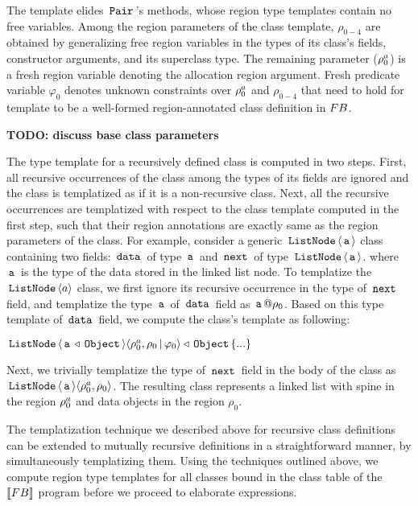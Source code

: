 The template elides $\,{\tt Pair}\,$'s methods, whose region type templates
contain no free variables. Among the region parameters of the class
template, $\rho_{0-4}$ are obtained by generalizing free region
variables in the types of its class's fields, constructor arguments,
and its superclass type.  The remaining parameter ($\rho^a_0$) is a
fresh region variable denoting the allocation region argument. Fresh
predicate variable $\varphi_0$ denotes unknown constraints over
$\rho^a_0$ and $\rho_{0-4}$ that need to hold for template to be a
well-formed region-annotated class definition in ${\sc FB}$. 

\textbf{TODO: discuss base class parameters}

The type template for a recursively defined class is computed in two
steps. First, all recursive occurrences of the class among the types of
its fields are ignored and the class is templatized as if it is a
non-recursive class. Next, all the recursive occurrences are
templatized with respect to the class template computed in the first
step, such that their region annotations are exactly same as the
region parameters of the class. For example, consider a generic
$\,{\tt ListNode}\,\langle \,{\tt a}\, \rangle$ class containing two fields: $\,{\tt data}\,$ of
type $\,{\tt a}\,$ and $\,{\tt next}\,$ of type $\,{\tt ListNode}\,\langle \,{\tt a}\, \rangle$.
where $\,{\tt a}\,$ is the type of the data stored in the linked list node.
To templatize the $\,{\tt ListNode}\,\langle a \rangle$ class, we first ignore its
recursive occurrence in the type of $\,{\tt next}\,$ field, and templatize
the type $\,{\tt a}\,$ of $\,{\tt data}\,$ field as $\,{\tt a}\,@\rho_0$. Based on this
type template of $\,{\tt data}\,$ field, we compute the class's template as
following:
\begin{center}
$\,{\tt ListNode}\,\langle \,{\tt a}\,\triangleleft\,{\tt Object}\, \rangle
\langle \rho^a_0,\rho_0\,|\,\varphi_0 \rangle \triangleleft \,{\tt Object}\, \{...\}$
\end{center}
Next, we trivially templatize the type of $\,{\tt next}\,$ field in the body
of the class as $\,{\tt ListNode}\,\langle \,{\tt a}\, \rangle\langle \rho^a_0,\rho_0 \rangle$.
The resulting class represents a linked list with spine in the region
$\rho^a_0$ and data objects in the region $\rho_0$.

The templatization technique we described above for recursive class
definitions can be extended to mutually recursive definitions in a
straightforward manner, by simultaneously templatizing them. Using the
techniques outlined above, we compute region type templates for all
classes bound in the class table of the $\llbracket {\sc FB} \rrbracket$ program before
we proceed to elaborate expressions.

